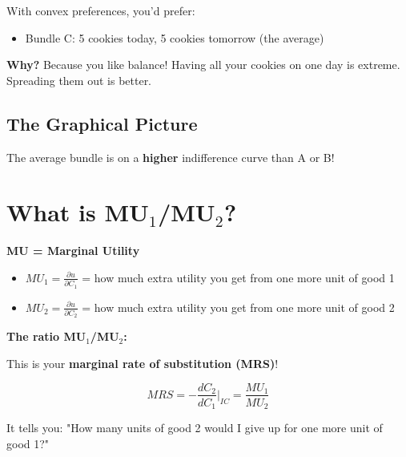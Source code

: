\documentclass[12pt]{article}
\begin{document}
With convex preferences, you'd prefer:
\begin{itemize}
\item Bundle C: 5 cookies today, 5 cookies tomorrow (the average)
\end{itemize}

\textbf{Why?} Because you like balance! Having all your cookies on one day is extreme. Spreading them out is better.

\subsection*{The Graphical Picture}

\begin{center}
\end{center}

The average bundle is on a \textbf{higher} indifference curve than A or B!

\newpage

\section*{What is MU$_1$/MU$_2$?}

\begin{tcolorbox}[colback=yellow!10!white,colframe=orange!75!black]
\textbf{MU = Marginal Utility}

\begin{itemize}
\item $MU_1 = \frac{\partial u}{\partial C_1}$ = how much extra utility you get from one more unit of good 1
\item $MU_2 = \frac{\partial u}{\partial C_2}$ = how much extra utility you get from one more unit of good 2
\end{itemize}

\vspace{0.3cm}

\textbf{The ratio MU$_1$/MU$_2$:}

This is your \textbf{marginal rate of substitution (MRS)}!

\[
MRS = -\frac{dC_2}{dC_1}\Big|_{IC} = \frac{MU_1}{MU_2}
\]

It tells you: "How many units of good 2 would I give up for one more unit of good 1?"
\end{tcolorbox}
\end{document}
